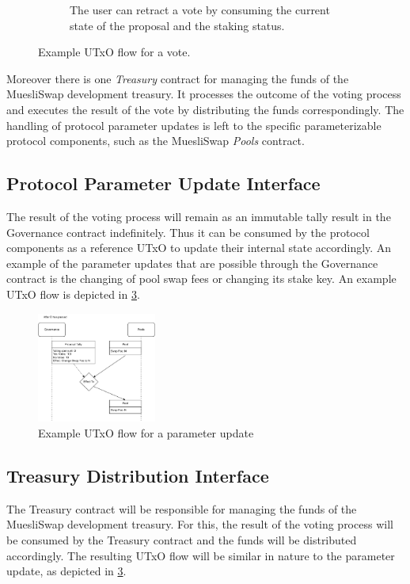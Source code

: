 \documentclass[11pt]{article}
\begin{document}
\begin{figure}
\begin{subfigure}[b]{0.5\textwidth}
        \caption{The user can retract a vote by consuming the current state of the proposal and the staking status.}
        \label{fig:utxo-flow-retract}
    \end{subfigure}
    \caption{Example UTxO flow for a vote.}
    \label{fig:utxo-flow-vote-complete}
\end{figure}

Moreover there is one \emph{Treasury} contract for managing the funds of the MuesliSwap development treasury.
It processes the outcome of the voting process and executes the result of the vote by distributing the funds correspondingly.
The handling of protocol parameter updates is left to the specific parameterizable protocol components,
such as the MuesliSwap \emph{Pools} contract.

\subsection{Protocol Parameter Update Interface}

The result of the voting process will remain as an immutable tally result in the Governance contract
indefinitely.
Thus it can be consumed by the protocol components as a reference UTxO to update their internal state accordingly.
An example of the parameter updates that are possible through the Governance contract is the changing of pool swap fees
or changing its stake key.
An example UTxO flow is depicted in \cref{fig:utxo-flow-params}.

\begin{figure}
    \centering
    \includegraphics[width=0.35\textwidth]{figures/pool-param-update.pdf}
    \caption{Example UTxO flow for a parameter update}
    \label{fig:utxo-flow-params}
\end{figure}

\subsection{Treasury Distribution Interface}

The Treasury contract will be responsible for managing the funds of the MuesliSwap development treasury.
For this, the result of the voting process will be consumed by the Treasury contract and the funds will be distributed accordingly.
The resulting UTxO flow will be similar in nature to the parameter update, as depicted in \cref{fig:utxo-flow-params}.
\end{document}
